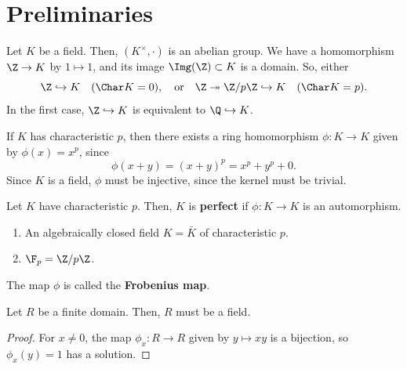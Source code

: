 
\section{Preliminaries}

Let $K$ be a field. Then, $(K^\times, \cdot)$ is an abelian group. We have a homomorphism $\Z \to K$ by $1 \mapsto 1$, and its image $\Img(\Z) \subset K$ is a domain. So, either
$$\Z \hookrightarrow K \quad (\Char K = 0), \quad \text{or} \quad \Z \twoheadrightarrow \Z/p\Z \hookrightarrow K \quad (\Char K = p).$$
In the first case, $\Z \hookrightarrow K$ is equivalent to $\Q \hookrightarrow K$.

\begin{notebox*}[Observation]
    If $K$ has characteristic $p$, then there exists a ring homomorphism $\phi : K \to K$ given by $\phi(x) = x^p$, since
    $$\phi(x+y) = (x+y)^p = x^p + y^p + 0.$$
    Since $K$ is a field, $\phi$ must be injective, since the kernel must be trivial.
\end{notebox*}

\begin{defn}
    Let $K$ have characteristic $p$. Then, $K$ is \textbf{perfect} if $\phi : K \to K$ is an automorphism.
\end{defn}

\begin{ex}
    \begin{enumerate}
        \item An algebraically closed field $K = \bar K$ of characteristic $p$.
        \item $\F_p = \Z/p\Z$.
    \end{enumerate}
\end{ex}

\begin{defn}
    The map $\phi$ is called the \textbf{Frobenius map}.
\end{defn}

\begin{thm}
    Let $R$ be a finite domain. Then, $R$ must be a field.
\end{thm}

\begin{proof}
    For $x \neq 0$, the map $\phi_x : R \to R$ given by $y \mapsto xy$ is a bijection, so $\phi_x(y) = 1$ has a solution.
\end{proof}

